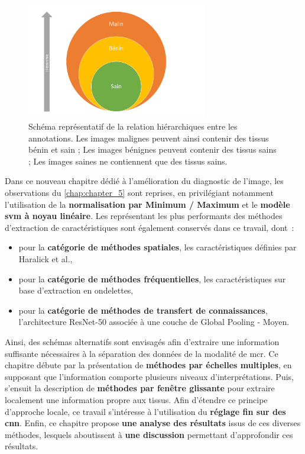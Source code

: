 \begin{figure}[H]
    \centering
    \includegraphics[width=0.7\textwidth]{contents/chapter_6/resources/scheme_image_improvement_annotations_hierarchy.pdf}
    \caption{Schéma représentatif de la relation hiérarchiques entre les annotations. Les images malignes peuvent ainsi contenir des tissus bénin et sain ; Les images bénignes peuvent contenir des tissus sains ; Les images saines ne contiennent que des tissus sains.}
    \label{fig:scheme_image_improvement_annotations_hierarchy}
\end{figure}\par

Dans ce nouveau chapitre dédié à l'amélioration du diagnostic de l'image, les observations du \cref{chap:chapter_5} sont reprises, en privilégiant notamment l'utilisation de la \textbf{normalisation par Minimum / Maximum} et le \textbf{modèle \gls{svm} à noyau linéaire}. Les représentant les plus performants des méthodes d'extraction de caractéristiques sont également conservés dans ce travail, dont~:
\begin{itemize}
    \item pour la \textbf{catégorie de méthodes spatiales}, les caractéristiques définies par Haralick et al.,
    \item pour la \textbf{catégorie de méthodes fréquentielles}, les caractéristiques sur base d'extraction en ondelettes,
    \item pour la \textbf{catégorie de méthodes de transfert de connaissances}, l'architecture ResNet-50 associée à une couche de Global Pooling - Moyen.
\end{itemize}\par

Ainsi, des schémas alternatifs sont envisagés afin d'extraire une information suffisante nécessaires à la séparation des données de la modalité de \gls{mcr}. Ce chapitre débute par la présentation de \textbf{méthodes par échelles multiples}, en supposant que l'information comporte plusieurs niveaux d'interprétations. Puis, s'ensuit la description de \textbf{méthodes par fenêtre glissante} pour extraire localement une information propre aux tissus. Afin d'étendre ce principe d'approche locale, ce travail s'intéresse à l'utilisation du \textbf{réglage fin sur des \gls{cnn}}. Enfin, ce chapitre propose \textbf{une analyse des résultats} issus de ces diverses méthodes, lesquels aboutissent à \textbf{une discussion} permettant d'approfondir ces résultats.\par
\clearpage

